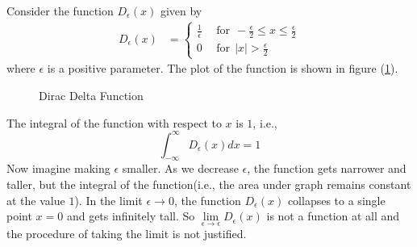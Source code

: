 


	Consider the function $D_\epsilon(x)$ given by
	\begin{eqnarray}
	D_\epsilon(x) &= 
		\begin{cases}
			\frac{1}{\epsilon} \ \ &\text{for} \ \  -\frac{\epsilon}{2} \leq x \leq \frac{\epsilon}{2} \\
			0 \ \ &\text{for} \ \  |x| > \frac{\epsilon}{2} 
		\end{cases}
	\end{eqnarray}
	where $\epsilon$ is a positive parameter. The plot of the function is shown in figure (\ref{fig.cpt1.figure1}).
	
	\begin{figure}
		\centering
		\caption{Dirac Delta Function}
		\label{fig.cpt1.figure1}
	\end{figure}
	
	The integral of the function with respect to $x$ is $1$, i.e.,
	\begin{equation}
		\int_{-\infty}^{\infty} D_\epsilon(x) dx = 1
	\end{equation}
	Now imagine making $\epsilon$ smaller. As we decrease $\epsilon$, the function gets narrower and taller, but the integral of the function(i.e., the area under graph remains constant at the value $1$).
	In the limit $\epsilon \rightarrow 0$, the function $D_\epsilon(x)$ collapses to a single  point $x=0$ and gets infinitely tall. So $\lim\limits_{\epsilon \rightarrow \epsilon} D_\epsilon(x)$ is not a function at all and the procedure of taking the limit is not justified.
	

